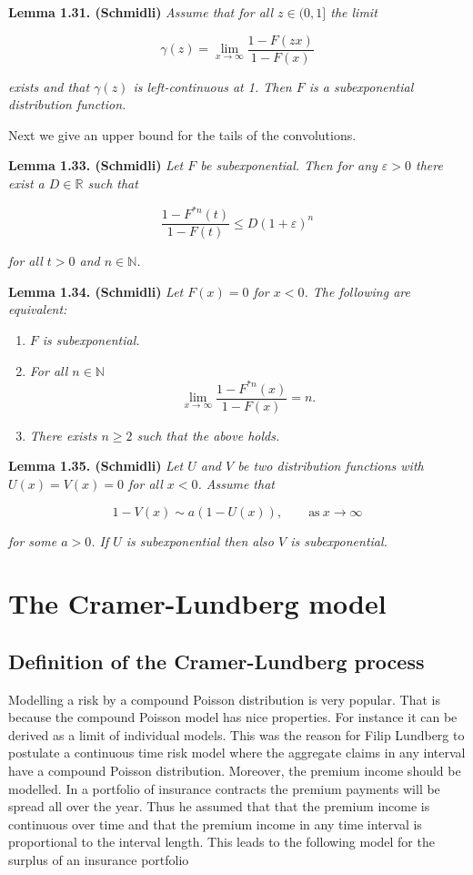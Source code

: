 \documentclass[a4paper,10pt,openany]{book}
\providecommand{\tightlist}{%
 \setlength{\itemsep}{0pt}\setlength{\parskip}{0pt}}
\begin{document}
\textbf{Lemma 1.31. (Schmidli)} \emph{Assume that for all \(z\in (0,1]\) the limit}

\[
\gamma(z)=\lim_{x\to\infty}\frac{1-F(zx)}{1-F(x)}
\]

\emph{exists and that \(\gamma(z)\) is left-continuous at 1. Then \(F\) is a subexponential distribution function.}

Next we give an upper bound for the tails of the convolutions.

\textbf{Lemma 1.33. (Schmidli)} \emph{Let \(F\) be subexponential. Then for any \(\varepsilon>0\) there exist a \(D\in\mathbb R\) such that}

\[
\frac{1-F^{*n}(t)}{1-F(t)}\le D(1+\varepsilon)^n
\]

\emph{for all \(t>0\) and \(n\in\mathbb N\).}

\textbf{Lemma 1.34. (Schmidli)} \emph{Let \(F(x)=0\) for \(x<0\). The following are equivalent:}

\begin{enumerate}
\def\labelenumi{\roman{enumi})}
\tightlist
\item
  \emph{\(F\) is subexponential.}
\item
  \emph{For all \(n\in\mathbb N\)}
  \[\lim_{x\to\infty}\frac{1-F^{*n}(x)}{1-F(x)}=n.\]
\item
  \emph{There exists \(n\ge 2\) such that the above holds.}
\end{enumerate}

\textbf{Lemma 1.35. (Schmidli)} \emph{Let \(U\) and \(V\) be two distribution functions with \(U(x)=V(x)=0\) for all \(x<0\). Assume that}

\[
1-V(x)\sim a(1-U(x)),\qquad \text{as}\ x\to\infty
\]

\emph{for some \(a>0\). If \(U\) is subexponential then also \(V\) is subexponential.}

\hypertarget{the-cramer-lundberg-model}{%
\section{The Cramer-Lundberg model}\label{the-cramer-lundberg-model}}

\hypertarget{definition-of-the-cramer-lundberg-process}{%
\subsection{Definition of the Cramer-Lundberg process}\label{definition-of-the-cramer-lundberg-process}}

Modelling a risk by a compound Poisson distribution is very popular. That is because the compound Poisson model has nice properties. For instance it can be derived as a limit of individual models. This was the reason for Filip Lundberg to postulate a continuous time risk model where the aggregate claims in any interval have a compound Poisson distribution. Moreover, the premium income should be modelled. In a portfolio of insurance contracts the premium payments will be spread all over the year. Thus he assumed that that the premium income is continuous over time and that the premium income in any time interval is proportional to the interval length. This leads to the following model for the surplus of an insurance portfolio
\end{document}
